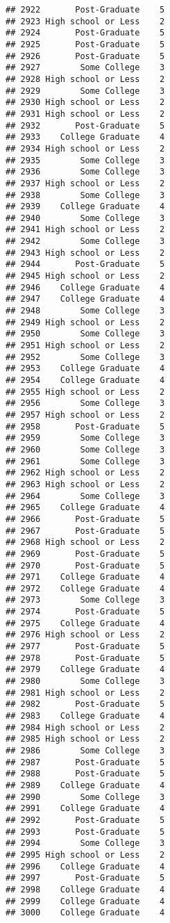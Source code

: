\documentclass[
]{article}
\begin{document}
\begin{verbatim}
## 2922       Post-Graduate    5
## 2923 High school or Less    2
## 2924       Post-Graduate    5
## 2925       Post-Graduate    5
## 2926       Post-Graduate    5
## 2927        Some College    3
## 2928 High school or Less    2
## 2929        Some College    3
## 2930 High school or Less    2
## 2931 High school or Less    2
## 2932       Post-Graduate    5
## 2933    College Graduate    4
## 2934 High school or Less    2
## 2935        Some College    3
## 2936        Some College    3
## 2937 High school or Less    2
## 2938        Some College    3
## 2939    College Graduate    4
## 2940        Some College    3
## 2941 High school or Less    2
## 2942        Some College    3
## 2943 High school or Less    2
## 2944       Post-Graduate    5
## 2945 High school or Less    2
## 2946    College Graduate    4
## 2947    College Graduate    4
## 2948        Some College    3
## 2949 High school or Less    2
## 2950        Some College    3
## 2951 High school or Less    2
## 2952        Some College    3
## 2953    College Graduate    4
## 2954    College Graduate    4
## 2955 High school or Less    2
## 2956        Some College    3
## 2957 High school or Less    2
## 2958       Post-Graduate    5
## 2959        Some College    3
## 2960        Some College    3
## 2961        Some College    3
## 2962 High school or Less    2
## 2963 High school or Less    2
## 2964        Some College    3
## 2965    College Graduate    4
## 2966       Post-Graduate    5
## 2967       Post-Graduate    5
## 2968 High school or Less    2
## 2969       Post-Graduate    5
## 2970       Post-Graduate    5
## 2971    College Graduate    4
## 2972    College Graduate    4
## 2973        Some College    3
## 2974       Post-Graduate    5
## 2975    College Graduate    4
## 2976 High school or Less    2
## 2977       Post-Graduate    5
## 2978       Post-Graduate    5
## 2979    College Graduate    4
## 2980        Some College    3
## 2981 High school or Less    2
## 2982       Post-Graduate    5
## 2983    College Graduate    4
## 2984 High school or Less    2
## 2985 High school or Less    2
## 2986        Some College    3
## 2987       Post-Graduate    5
## 2988       Post-Graduate    5
## 2989    College Graduate    4
## 2990        Some College    3
## 2991    College Graduate    4
## 2992       Post-Graduate    5
## 2993       Post-Graduate    5
## 2994        Some College    3
## 2995 High school or Less    2
## 2996    College Graduate    4
## 2997       Post-Graduate    5
## 2998    College Graduate    4
## 2999    College Graduate    4
## 3000    College Graduate    4

\end{verbatim}
\end{document}
